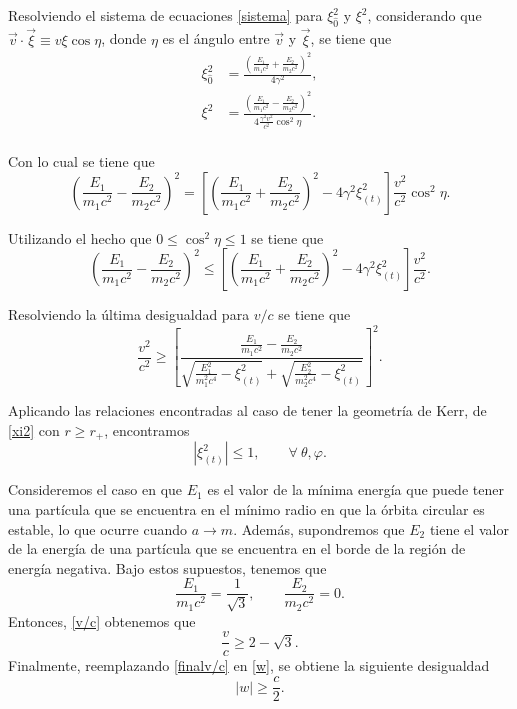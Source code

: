 Resolviendo el sistema de ecuaciones \eqref{sistema} para $\xi_{\hat{0}}^2$ y $\xi^2$, considerando que $\vec{v}\cdot \vec{\xi} \equiv v\xi \cos \eta$, donde $\eta$ es el ángulo entre $\vec{v}$ y $\vec{\xi}$, se tiene que
\begin{equation}
\begin{aligned}
\xi_{\hat{0}}^2&=\frac{\left(\frac{E_1}{m_1c^2}+\frac{E_2}{m_2c^2} \right)^2}{4\gamma ^2},\\
\xi^2&=\frac{\left(\frac{E_1}{m_1c^2}-\frac{E_2}{m_2c^2} \right)^2}{4\frac{\gamma ^2 v^2}{c^2}\cos^2 \eta}. \\
\end{aligned}
\end{equation}

Con lo cual se tiene que
\begin{equation}
\left(\frac{E_1}{m_1c^2}-\frac{E_2}{m_2c^2} \right)^2=\left[\left(\frac{E_1}{m_1c^2}+\frac{E_2}{m_2c^2}\right)^2-4\gamma^2 \xi_{(t)}^2   \right]\frac{v^2}{c^2}\cos^2 \eta.
\end{equation}

Utilizando el hecho que $0\leq\cos^2\eta\leq 1$ se tiene que
\begin{equation}
\left(\frac{E_1}{m_1c^2}-\frac{E_2}{m_2c^2} \right)^2 \leq \left[\left(\frac{E_1}{m_1c^2}+\frac{E_2}{m_2c^2} \right)^2-4\gamma^2 \xi_{(t)}^2 \right]\frac{v^2}{c^2}.
\end{equation}

Resolviendo la última desigualdad para $v/c$ se tiene que
\begin{equation}\label{v/c}
\frac{v^2}{c^2} \geq \left[ \frac{\frac{E_1}{m_1c^2} -\frac{E_2}{m_2c^2}}{\sqrt{\frac{E_1^2}{m_{1}^{2}c^{4}}-\xi_{(t)}^2}+\sqrt{ \frac{E_2^2}{m_{2}^{2}c^{4}} -\xi_{(t)}^2}}\right]^2 .
\end{equation}

Aplicando las relaciones encontradas al caso de tener la geometría de Kerr, de \eqref{xi2} con $r \geq r_+$, encontramos
\begin{equation}
|\xi_{(t)}^2| \leq 1, \qquad  \forall\ \theta,\varphi .
\end{equation}

Consideremos el caso en que $E_1$ es el valor de la mínima energía que puede tener una partícula que se encuentra en el mínimo radio en que la órbita circular es estable, lo que ocurre cuando $a \rightarrow m$. Además, supondremos que $E_2$ tiene el valor de la energía de una partícula que se encuentra en el borde de la región de energía negativa. Bajo estos supuestos, tenemos que
\begin{equation}
\frac{E_1}{m_1c^2}=\frac{1}{\sqrt{3}}, \qquad \frac{E_2}{m_2c^2}=0.
\end{equation}
Entonces, \eqref{v/c} obtenemos que
\begin{equation}\label{finalv/c}
\frac{v}{c} \geq 2-\sqrt{3}.
\end{equation}
Finalmente, reemplazando \eqref{finalv/c} en \eqref{w}, se obtiene la siguiente desigualdad
\begin{equation}
|w|\geq \frac{c}{2}.
\end{equation}

